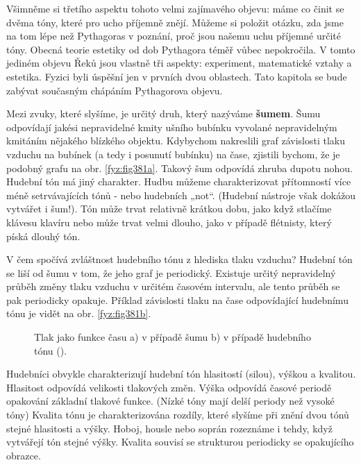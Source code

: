   Všimněme si třetího aspektu tohoto velmi zajímavého objevu: máme co činit se dvěma tóny, které 
  pro ucho příjemně znějí. Můžeme si položit otázku, zda jsme na tom lépe než Pythagoras v 
  poznání, proč jsou našemu uchu příjemné určité tóny. Obecná teorie estetiky od dob Pythagora 
  téměř vůbec nepokročila. V tomto jediném objevu Řeků jsou vlastně tři aspekty: experiment, 
  matematické vztahy a estetika. Fyzici byli úspěšní jen v prvních dvou oblastech. Tato kapitola 
  se bude zabývat současným chápáním Pythagorova objevu. 
    
  Mezi zvuky, které slyšíme, je určitý druh, který nazýváme \textbf{šumem}. Šumu odpovídají 
  jakési nepravidelné kmity ušního bubínku vyvolané nepravidelným kmitáním nějakého blízkého 
  objektu. Kdybychom nakreslili graf závislosti tlaku vzduchu na bubínek (a tedy i posunutí 
  bubínku) na čase, zjistili bychom, že je podobný grafu na obr. \ref{fyz:fig381a}. Takový šum 
  odpovídá zhruba dupotu nohou. Hudební tón má jiný charakter. Hudbu můžeme charakterizovat 
  přítomností více méně setrvávajících tónů - nebo hudebních „not“. (Hudební nástroje však dokážou 
  vytvářet i šum!). Tón může trvat relativně krátkou dobu, jako když stlačíme klávesu klavíru nebo 
  může trvat velmi dlouho, jako v případě flétnisty, který píská dlouhý tón. 
    
  V čem spočívá zvláštnost hudebního tónu z hlediska tlaku vzduchu? Hudební tón se liší od šumu v 
  tom, že jeho graf je periodický. Existuje určitý nepravidelný průběh změny tlaku vzduchu v 
  určitém časovém intervalu, ale tento průběh se pak periodicky opakuje. Příklad závislosti tlaku 
  na čase odpovídající hudebnímu tónu je vidět na obr. \ref{fyz:fig381b}.

  \begin{figure}[ht!] %
    \centering
     \newline
    \caption{Tlak jako funkce času a) v případě šumu b) v případě hudebního tónu
             (\cite[s.~673]{Feynman01}).}
    \label{fyz:fig381}
  \end{figure}
  
  Hudebníci obvykle charakterizují hudební tón hlasitostí (silou), výškou a kvalitou. Hlasitost 
  odpovídá velikosti tlakových změn. Výška odpovídá časové periodě opakování základní tlakové 
  funkce. (Nízké tóny mají delší periody než vysoké tóny) Kvalita tónu je charakterizována rozdíly, 
  které slyšíme při znění dvou tónů stejné hlasitosti a výšky. Hoboj, housle nebo soprán rozeznáme 
  i tehdy, když vytvářejí tón stejné výšky. Kvalita souvisí se strukturou periodicky se opakujícího 
  obrazce.
  

